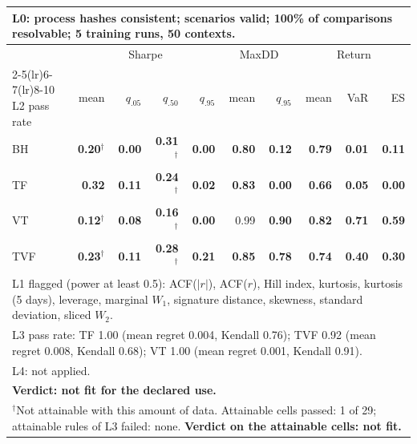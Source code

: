 \begin{tabular}{lrrrrrrrrr}
\toprule
\multicolumn{10}{p{13.5cm}}{L0: process hashes consistent; scenarios valid; 100\% of comparisons resolvable; 5 training runs, 50 contexts.} \\
\midrule
 & \multicolumn{4}{c}{Sharpe} & \multicolumn{2}{c}{MaxDD} & \multicolumn{3}{c}{Return} \\
\cmidrule(lr){2-5}\cmidrule(lr){6-7}\cmidrule(lr){8-10}
L2 pass rate & mean & $q_{.05}$ & $q_{.50}$ & $q_{.95}$ & mean & $q_{.95}$ & mean & VaR & ES \\
\midrule
BH & \textbf{0.20}$^{\dagger}$ & \textbf{0.00} & \textbf{0.31}$^{\dagger}$ & \textbf{0.00} & \textbf{0.80} & \textbf{0.12} & \textbf{0.79} & \textbf{0.01} & \textbf{0.11} \\
TF & \textbf{0.32} & \textbf{0.11} & \textbf{0.24}$^{\dagger}$ & \textbf{0.02} & \textbf{0.83} & \textbf{0.00} & \textbf{0.66} & \textbf{0.05} & \textbf{0.00} \\
VT & \textbf{0.12}$^{\dagger}$ & \textbf{0.08} & \textbf{0.16}$^{\dagger}$ & \textbf{0.00} & 0.99 & \textbf{0.90} & \textbf{0.82} & \textbf{0.71} & \textbf{0.59} \\
TVF & \textbf{0.23}$^{\dagger}$ & \textbf{0.11} & \textbf{0.28}$^{\dagger}$ & \textbf{0.21} & \textbf{0.85} & \textbf{0.78} & \textbf{0.74} & \textbf{0.40} & \textbf{0.30} \\
\midrule
\multicolumn{10}{p{13.5cm}}{L1 flagged (power at least 0.5): ACF($|r|$), ACF($r$), Hill index, kurtosis, kurtosis (5 days), leverage, marginal $W_1$, signature distance, skewness, standard deviation, sliced $W_2$.} \\
\multicolumn{10}{p{13.5cm}}{L3 pass rate: TF 1.00 (mean regret 0.004, Kendall 0.76); TVF 0.92 (mean regret 0.008, Kendall 0.68); VT 1.00 (mean regret 0.001, Kendall 0.91).} \\
\multicolumn{10}{p{13.5cm}}{L4: not applied.} \\
\multicolumn{10}{p{13.5cm}}{\textbf{Verdict: not fit for the declared use.}} \\
\multicolumn{10}{p{13.5cm}}{$^{\dagger}$Not attainable with this amount of data. Attainable cells passed: 1 of 29; attainable rules of L3 failed: none. \textbf{Verdict on the attainable cells: not fit.}} \\
\bottomrule
\end{tabular}
